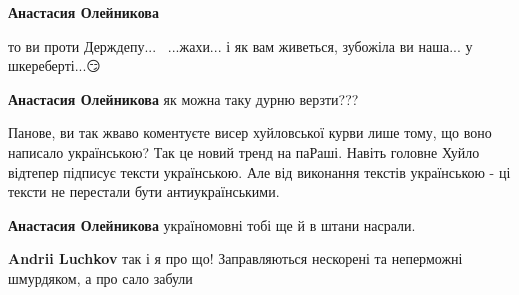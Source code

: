 \begin{itemize}
\begin{itemize}
 
\textbf{Анастасия Олейникова} 

то ви проти Держдепу...🤔😳🙄...жахи... і як вам живеться, зубожіла ви наша...
у шкереберті...😏


 
\textbf{Анастасия Олейникова} як можна таку дурню верзти???

 

Панове, ви так жваво коментуєте висер хуйловської курви лише тому, що воно
написало українською? \Smiley[1.0][yellow] Так це новий тренд на паРаші. Навіть головне Хуйло
відтепер підписує тексти українською. Але від виконання текстів українською -
ці тексти не перестали бути антиукраїнськими.

 
\textbf{Анастасия Олейникова} україномовні тобі ще й в штани насрали.

 
\textbf{Andrii Luchkov} так і я про що! Заправляються нескорені та неперможні шмурдяком, а про сало забули \Smiley[1.0][yellow]

 

\end{itemize}
\end{itemize}
